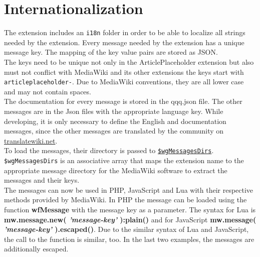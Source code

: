 \section{Internationalization}

The extension includes an \texttt{i18n} folder in order to be able to localize all strings needed by the extension. Every message needed by the extension has a unique message key. The mapping of the key value pairs are stored as JSON. \\
The keys need to be unique not only in the ArticlePlaceholder extension but also must not conflict with MediaWiki and its other extensions the keys start with \texttt{articleplaceholder-}. Due to MediaWiki conventions, they are all lower case and may not contain spaces.  \\
The documentation for every message is stored in the qqq.json file. The other messages are in the Json files with the appropriate language key. While developing, it is only necessary to define the English and documentation messages, since the other messages are translated by the community on \href{https://translatewiki.net/}{translatewiki.net}. \\
To load the messages, their directory is passed to \href{https://www.mediawiki.org/wiki/Manual:$wgMessagesDirs}{\texttt{\$wgMessagesDirs}}. \texttt{\$wgMessagesDirs} is an associative array that maps the extension name to the appropriate message directory for the MediaWiki software to extract the messages and their keys. \\
The messages can now be used in PHP, JavaScript and Lua with their respective methods provided by MediaWiki. In PHP the message can be loaded using the function \textbf{wfMessage} with the message key as a parameter. The syntax for Lua is \textbf{mw.message.new( \textit{'message-key'} ):plain()} and for JavaScript \textbf{mw.message( \textit{'message-key'} ).escaped()}. Due to the similar syntax of Lua and JavaScript, the call to the function is similar, too. In the last two examples, the messages are additionally escaped.